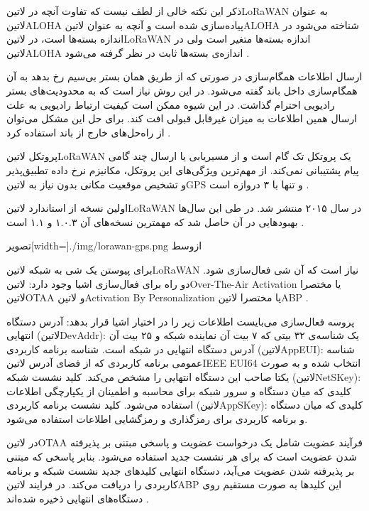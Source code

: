 ذکر این نکته خالی از لطف نیست که تفاوت آنچه در ‌لاتین{LoRaWAN} به عنوان ‌لاتین{ALOHA} پیاده‌سازی شده است و آنچه به عنوان ‌لاتین{ALOHA} شناخته می‌شود در اندازه بسته‌ها است،
در ‌لاتین{LoRaWAN} اندازه بسته‌ها متغیر است ولی در ‌لاتین{ALOHA} اندازه‌ی بسته‌ها ثابت در نظر گرفته می‌شود
.

ارسال اطلاعات همگام‌سازی در صورتی که از طریق همان بستر بی‌سیم رخ بدهد به آن همگام‌سازی داخل باند گفته می‌شود. در این روش نیاز است که به محدودیت‌های بستر رادیویی احترام گذاشت.
در این شیوه ممکن است کیفیت ارتباط رادیویی به علت ارسال همین اطلاعات به میزان غیرقابل قبولی افت کند. برای حل این مشکل می‌توان از راه‌حل‌های خارج از باند استفاده کرد
.

پروتکل ‌لاتین{LoRaWAN} یک پروتکل تک گام است و از مسیریابی یا ارسال چند گامی پیام پشتیبانی نمی‌کند. از مهم‌ترین ویژگی‌های این پروتکل، مکانیزم نرخ داده تطبیق‌پذیر و تشخیص
موقعیت مکانی بدون نیاز به ‌لاتین{GPS} و تنها با ۳ دروازه است
.

اولین نسخه از استاندارد ‌لاتین{LoRaWAN} در سال ۲۰۱۵ منتشر شد. در طی این سال‌ها بهبودهایی در آن حاصل شد که مهمترین نسخه‌های آن ۱.۰.۳ و ۱.۱ است
.

‌تصویر[width=\textwidth]{./img/lorawan-gps.png}
‌ازوسط

برای پیوستن یک شی به شبکه ‌لاتین{LoRaWAN} نیاز است که آن شی فعال‌سازی شود. دو راه برای فعال‌سازی اشیا وجود دارد: ‌لاتین{Over-The-Air Activation} یا مختصرا ‌لاتین{OTAA}
و ‌لاتین{Activation By Personalization} یا مختصرا ‌لاتین{ABP}
.

پروسه فعال‌سازی می‌بایست اطلاعات زیر را در اختیار اشیا قرار بدهد:
 آدرس دستگاه انتهایی (‌لاتین{DevAddr}): یک شناسه‌ی ۳۲ بیتی که ۷ بیت آن نماینده شبکه و ۲۵ بیت آن آدرس دستگاه انتهایی در شبکه است.
 شناسه برنامه کاربردی (‌لاتین{AppEUI}): شناسه عمومی برنامه کاربردی که از فضای آدرس ‌لاتین{IEEE EUI64} انتخاب شده و به صورت یکتا صاحب این دستگاه انتهایی را مشخص می‌کند.
 کلید نشست شبکه (‌لاتین{NetSKey}): کلیدی که میان دستگاه و سرور شبکه برای محاسبه و اطمینان از یکپارچگی اطلاعات استفاده می‌شود.
 کلید نشست برنامه کاربردی (‌لاتین{AppSKey}): کلیدی که میان دستگاه و برنامه کاربردی برای رمزگذاری و رمزگشایی اطلاعات استفاده می‌شود.

در ‌لاتین{OTAA} فرآیند عضویت شامل یک درخواست عضویت و پاسخی مبتنی بر پذیرفته شدن عضویت است که برای هر نشست جدید استفاده می‌شود.
بنابر پاسخی که مبتنی بر پذیرفته شدن عضویت می‌آید، دستگاه انتهایی کلیدهای جدید نشست شبکه و برنامه کاربردی را دریافت می‌کند.
در فرایند ‌لاتین{ABP} این کلیدها به صورت مستقیم روی دستگاه‌های انتهایی ذخیره شده‌اند
.

